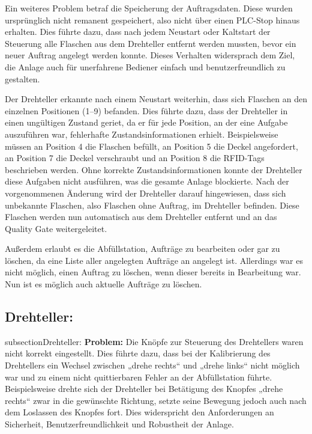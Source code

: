 Ein weiteres Problem betraf die Speicherung der Auftragsdaten. Diese wurden ursprünglich nicht remanent gespeichert, also nicht über einen 
PLC-Stop hinaus erhalten. Dies führte dazu, dass nach jedem Neustart oder Kaltstart der Steuerung alle Flaschen aus dem Drehteller entfernt 
werden mussten, bevor ein neuer Auftrag angelegt werden konnte. Dieses Verhalten widersprach dem Ziel, die Anlage auch für unerfahrene Bediener 
einfach und benutzerfreundlich zu gestalten.

Der Drehteller erkannte nach einem Neustart weiterhin, dass sich Flaschen an den einzelnen Positionen (1–9) befanden. Dies führte dazu, dass der 
Drehteller in einen ungültigen Zustand geriet, da er für jede Position, an der eine Aufgabe auszuführen war, fehlerhafte Zustandsinformationen 
erhielt. Beispielsweise müssen an Position 4 die Flaschen befüllt, an Position 5 die Deckel angefordert, an Position 7 die Deckel verschraubt 
und an Position 8 die RFID-Tags beschrieben werden. Ohne korrekte Zustandsinformationen konnte der Drehteller diese Aufgaben nicht ausführen, 
was die gesamte Anlage blockierte. Nach der vorgenommenen Änderung wird der Drehteller darauf hingewiesen, dass sich unbekannte Flaschen, also 
Flaschen ohne Auftrag, im Drehteller befinden. Diese Flaschen werden nun automatisch aus dem Drehteller entfernt und an das Quality Gate 
weitergeleitet.

Außerdem erlaubt es die Abfüllstation, Aufträge zu bearbeiten oder gar zu löschen, da eine Liste aller angelegten Aufträge an angelegt ist. 
Allerdings war es nicht möglich, einen Auftrag zu löschen, wenn dieser bereits in Bearbeitung war. Nun ist es möglich auch aktuelle Aufträge zu 
löschen.

\subsection{Drehteller:}
subsection{Drehteller:}  
\textbf{Problem:}  
Die Knöpfe zur Steuerung des Drehtellers waren nicht korrekt eingestellt. Dies führte dazu, dass bei der Kalibrierung des Drehtellers ein 
Wechsel zwischen „drehe rechts“ und „drehe links“ nicht möglich war und zu einem nicht quittierbaren Fehler an der Abfüllstation führte. 
Beispielsweise drehte sich der Drehteller bei Betätigung des Knopfes „drehe rechts“ zwar in die gewünschte Richtung, setzte seine Bewegung 
jedoch auch nach dem Loslassen des Knopfes fort. Dies widerspricht den Anforderungen an Sicherheit, Benutzerfreundlichkeit und Robustheit 
der Anlage.  

